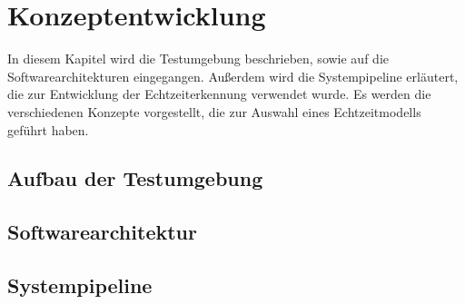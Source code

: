
\chapter{Konzeptentwicklung}

In diesem Kapitel wird die Testumgebung beschrieben, sowie auf die Softwarearchitekturen eingegangen.
Außerdem wird die Systempipeline erläutert, die zur Entwicklung der Echtzeiterkennung verwendet wurde. 
Es werden die verschiedenen Konzepte vorgestellt, die zur Auswahl eines Echtzeitmodells geführt haben. 



\section{Aufbau der Testumgebung}



\section{Softwarearchitektur}



\section{Systempipeline}